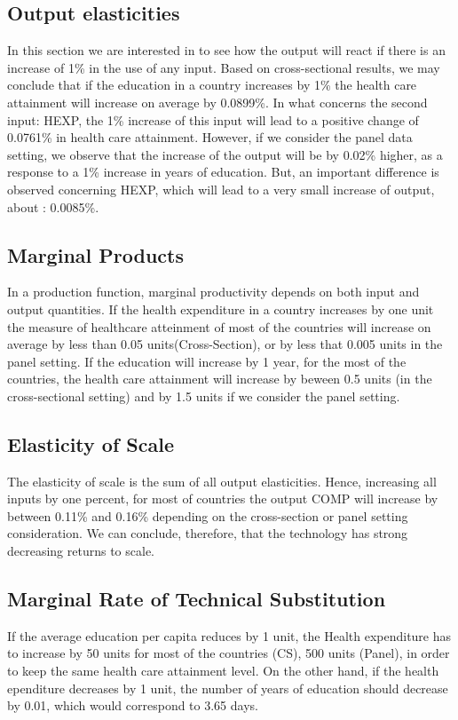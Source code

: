 \documentclass[12pt,a4paper]{article}\usepackage[]{graphicx}\usepackage[]{color}
\begin{document}
\subsection{Output elasticities}
In this section we are interested in to see how the output will react if there is an increase of 1\% in the use of any input. Based on cross-sectional results, we may conclude that if the education in a country increases by 1\% the health care attainment will increase on average by 0.0899\%. In what concerns the second input: HEXP, the 1\% increase of this input will lead to a positive change of 0.0761\% in health care attainment. However, if we consider the panel data setting, we observe that the increase of the output will be by 0.02\% higher, as a response to a 1\% increase in years of education. But, an important difference is observed concerning HEXP, which will lead to a very small increase of output, about : 0.0085\%.

\subsection{Marginal Products}
In a production function, marginal productivity depends on both input and output quantities. If the health expenditure in a country increases  by one unit the measure of healthcare atteinment of most of the countries will increase on average by less than 0.05 units(Cross-Section), or by less that  0.005 units in the panel setting. If the education will increase by 1 year, for the most of the countries, the health care attainment will increase by beween 0.5 units (in the cross-sectional setting) and by 1.5 units if we consider the panel setting.


\subsection{Elasticity of Scale}


The elasticity of scale is the sum of all output elasticities. Hence, increasing all  inputs by one percent, for most of countries
the output COMP will increase by between 0.11\% and 0.16\% depending on the cross-section or panel setting consideration.
We can conclude, therefore, that the technology has strong decreasing returns to scale.

\subsection{Marginal Rate of Technical Substitution}
If the average education per capita reduces by 1 unit, the Health expenditure has to increase by 50 units for most of the countries (CS), 500 units (Panel), in order to keep the same health care attainment level.
On the other hand, if the health ependiture decreases by 1 unit, the number of years of education should decrease by 0.01, which would correspond to 3.65 days.
\end{document}
